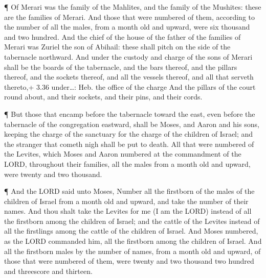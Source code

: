  ¶ Of Merari was the family of the Mahlites, and the family
of the Mushites: these are the families of Merari.  And
those that were numbered of them, according to the number of all the
males, from a month old and upward, were six thousand and two hundred.
 And the chief of the house of the father of the families
of Merari was Zuriel the son of Abihail: these shall pitch on the side
of the tabernacle northward.  And under the custody and
charge of the sons of Merari shall be the boards of the tabernacle, and
the bars thereof, and the pillars thereof, and the sockets thereof, and
all the vessels thereof, and all that serveth thereto,+ 3.36
under\ldots: Heb. the office of the charge  And the pillars
of the court round about, and their sockets, and their pins, and their
cords.

 ¶ But those that encamp before the tabernacle toward the
east, even before the tabernacle of the congregation eastward, shall be
Moses, and Aaron and his sons, keeping the charge of the sanctuary for
the charge of the children of Israel; and the stranger that cometh nigh
shall be put to death.  All that were numbered of the
Levites, which Moses and Aaron numbered at the commandment of the LORD,
throughout their families, all the males from a month old and upward,
were twenty and two thousand.

 ¶ And the LORD said unto Moses, Number all the firstborn
of the males of the children of Israel from a month old and upward, and
take the number of their names.  And thou shalt take the
Levites for me (I am the LORD) instead of all the firstborn among the
children of Israel; and the cattle of the Levites instead of all the
firstlings among the cattle of the children of Israel.  And
Moses numbered, as the LORD commanded him, all the firstborn among the
children of Israel.  And all the firstborn males by the
number of names, from a month old and upward, of those that were
numbered of them, were twenty and two thousand two hundred and
threescore and thirteen.

